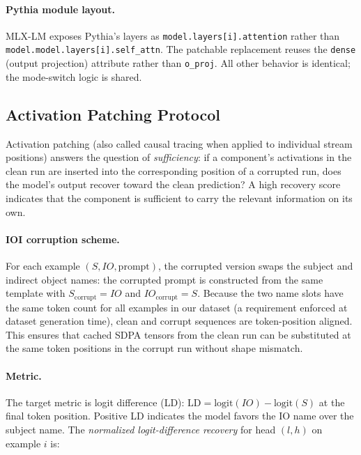 \documentclass[11pt,a4paper]{article}
\begin{document}
\paragraph{Pythia module layout.}
MLX-LM exposes Pythia's layers as \texttt{model.\allowbreak layers[i].\allowbreak attention} rather than
\texttt{model.\allowbreak model.\allowbreak layers[i].\allowbreak self\_attn}. The patchable replacement reuses the
\texttt{dense} (output projection) attribute rather than \texttt{o\_proj}. All other
behavior is identical; the mode-switch logic is shared.

\subsection{Activation Patching Protocol}
\label{sec:patching}

Activation patching (also called causal tracing when applied to individual stream
positions) answers the question of \emph{sufficiency}: if a component's activations in
the clean run are inserted into the corresponding position of a corrupted run, does the
model's output recover toward the clean prediction? A high recovery score indicates
that the component is sufficient to carry the relevant information on its own.

\paragraph{IOI corruption scheme.}
For each example $(S, \mathit{IO}, \text{prompt})$, the corrupted version swaps the
subject and indirect object names: the corrupted prompt is constructed from the same
template with $S_\text{corrupt} = \mathit{IO}$ and $\mathit{IO}_\text{corrupt} = S$.
Because the two name slots have the same token count for all examples in our dataset
(a requirement enforced at dataset generation time), clean and corrupt sequences are
token-position aligned. This ensures that cached SDPA tensors from the clean run can
be substituted at the same token positions in the corrupt run without shape mismatch.

\paragraph{Metric.}
The target metric is logit difference (LD):
$\text{LD} = \text{logit}(\mathit{IO}) - \text{logit}(S)$ at the final token position.
Positive LD indicates the model favors the IO name over the subject name. The
\emph{normalized logit-difference recovery} for head $(l, h)$ on example $i$ is:
\end{document}

